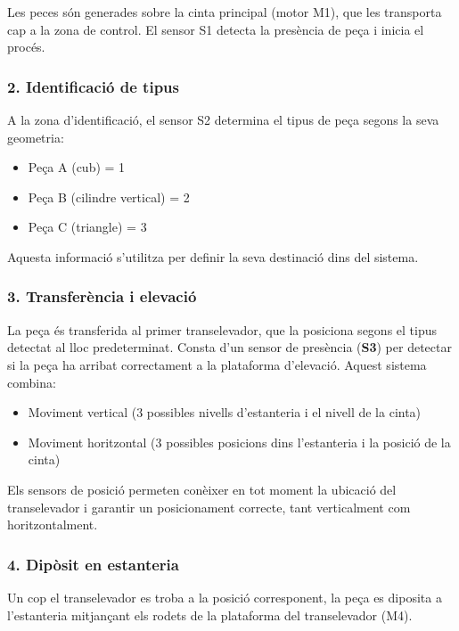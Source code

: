 \documentclass[a4paper,11pt,DIV=13,headings=normal,abstract=true,twoside=semi]{article}
\begin{document}
Les peces són generades sobre la cinta principal (motor M1), que les transporta cap a la zona de control. El sensor S1 detecta la presència de peça i inicia el procés.

\subsubsection*{2. Identificació de tipus}

A la zona d'identificació, el sensor S2 determina el tipus de peça segons la seva geometria:

\begin{itemize}
\item Peça A (cub) = 1
\item Peça B (cilindre vertical) = 2
\item Peça C (triangle) = 3
\end{itemize}

Aquesta informació s'utilitza per definir la seva destinació dins del sistema.

\subsubsection*{3. Transferència i elevació}

La peça és transferida al primer transelevador, que la posiciona segons el tipus detectat al lloc predeterminat. Consta d'un sensor de presència (\textbf{S3}) per detectar si la peça ha arribat correctament a la plataforma d'elevació. Aquest sistema combina:
\begin{itemize}
\item Moviment vertical (3 possibles nivells d'estanteria i el nivell de la cinta) 
\item Moviment horitzontal (3 possibles posicions dins l'estanteria i la posició de la cinta) 
\end{itemize}

Els sensors de posició permeten conèixer en tot moment la ubicació del transelevador i garantir un posicionament correcte, tant verticalment com horitzontalment.

\subsubsection*{4. Dipòsit en estanteria}

Un cop el transelevador es troba a la posició corresponent, la peça es diposita a l'estanteria mitjançant els rodets de la plataforma del transelevador (M4). 
\end{document}
